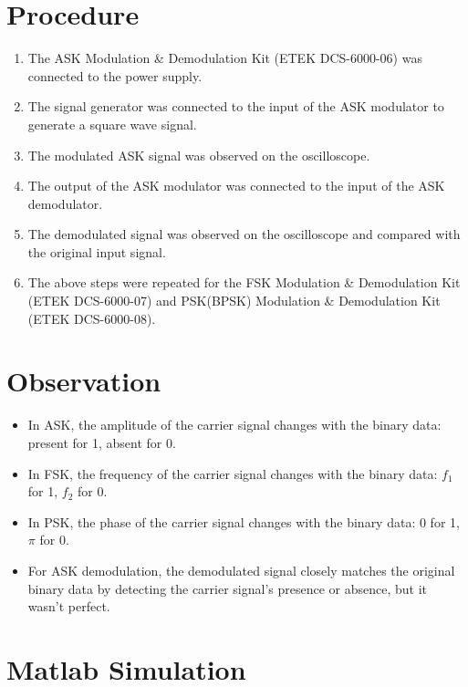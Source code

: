 \documentclass[12pt]{article}
\begin{document}
\section*{Procedure}
\begin{enumerate}
    \item The ASK Modulation \& Demodulation Kit (ETEK DCS-6000-06) was connected to the power supply.
    \item The signal generator was connected to the input of the ASK modulator to generate a square wave signal.
    \item The modulated ASK signal was observed on the oscilloscope.
    \item The output of the ASK modulator was connected to the input of the ASK demodulator.
    \item The demodulated signal was observed on the oscilloscope and compared with the original input signal.
    \item The above steps were repeated for the FSK Modulation \& Demodulation Kit (ETEK DCS-6000-07) and PSK(BPSK) Modulation \& Demodulation Kit (ETEK DCS-6000-08).
\end{enumerate}


\section*{Observation}
\begin{itemize}
    \item In ASK, the amplitude of the carrier signal changes with the binary data: present for 1, absent for 0.
    \item In FSK, the frequency of the carrier signal changes with the binary data: \( f_1 \) for 1, \( f_2 \) for 0.
    \item In PSK, the phase of the carrier signal changes with the binary data: 0 for 1, \( \pi \) for 0.
    \item For ASK demodulation, the demodulated signal closely matches the original binary data by detecting the carrier signal's presence or absence, but it wasn't perfect.
\end{itemize}


\section*{Matlab Simulation}
\end{document}
